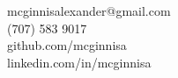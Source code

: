 \documentclass[margin,line]{resume}
\begin{document}
{


    \hfill mcginnisalexander@gmail.com       \vspace{0mm}\\\vspace{0mm}%
    \hfill (707) 583 9017           \vspace{0mm}\\\vspace{0mm}%
   \hfill github.com/mcginnisa \vspace{0mm}\\\vspace{0mm}%
   \hfill linkedin.com/in/mcginnisa \vspace{0mm}\\\vspace{-9mm}%
}
\end{document}
